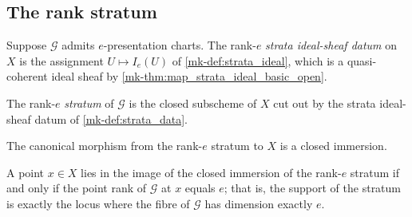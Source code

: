 \subsection{The rank stratum}

\begin{definition}
  \label{mk-def:strata_data}
  \leanok

  Suppose \(\mathcal G\) admits \(e\)-presentation charts.  The rank-\(e\)
  \emph{strata ideal-sheaf datum} on \(X\) is the assignment
  \(U \mapsto I_e(U)\) of \ref{mk-def:strata_ideal}, which is a quasi-coherent
  ideal sheaf by \ref{mk-thm:map_strata_ideal_basic_open}.
\end{definition}

\begin{definition}
  \label{mk-def:stratum}
  \leanok

  The rank-\(e\) \emph{stratum} of \(\mathcal G\) is the closed subscheme of
  \(X\) cut out by the strata ideal-sheaf datum of \ref{mk-def:strata_data}.
\end{definition}

\begin{definition}
  \label{mk-def:stratum_immersion}
  \leanok

  The canonical morphism from the rank-\(e\) stratum to \(X\) is a closed
  immersion.
\end{definition}

\begin{theorem}
  \label{mk-thm:mem_range_stratum}
  \leanok

  A point \(x \in X\) lies in the image of the closed immersion of the
  rank-\(e\) stratum if and only if the point rank of \(\mathcal G\) at \(x\)
  equals \(e\); that is, the support of the stratum is exactly the locus where
  the fibre of \(\mathcal G\) has dimension exactly \(e\).
\end{theorem}

